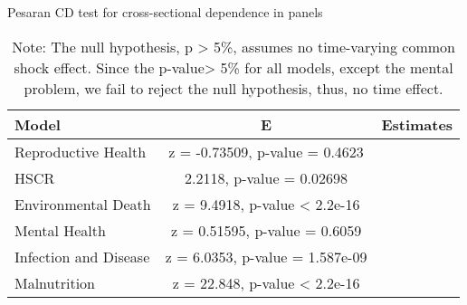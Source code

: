 \begin{table}[ht]
    \centering
    \caption{Pesaran CD test for cross-sectional dependence in panels}
    \begin{tabular}{lcc}
        \toprule
        \textbf{Model} & \textbf{E} & \textbf{Estimates} \\
        \midrule
        Reproductive Health & z = -0.73509, p-value = 0.4623 \\
        HSCR  & 2.2118, p-value = 0.02698 \\
        Environmental Death  & z = 9.4918, p-value < 2.2e-16 \\
        Mental Health & z = 0.51595, p-value = 0.6059 \\
        Infection and Disease  & z = 6.0353, p-value = 1.587e-09 \\
        Malnutrition & z = 22.848, p-value < 2.2e-16 \\
        \bottomrule
    \end{tabular}
    \vspace{0.5em} %
    \caption*{Note: The null hypothesis, p > 5\%, assumes no time-varying common shock effect. Since the p-value> 5\% for all models, except the mental problem, we fail to reject the null hypothesis, thus, no time effect.}
    \label{Tab::Cross_sect_depen_test}
\end{table}

